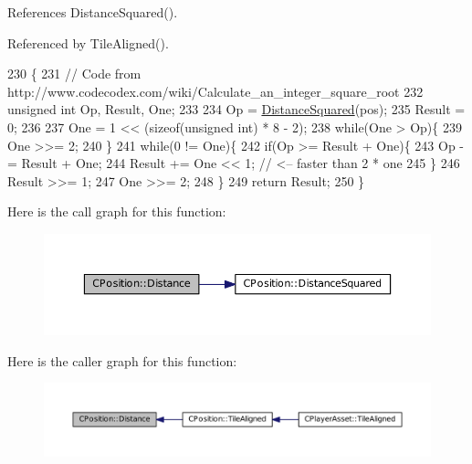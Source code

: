References Distance\+Squared().



Referenced by Tile\+Aligned().


\begin{DoxyCode}
230                                            \{
231     \textcolor{comment}{// Code from http://www.codecodex.com/wiki/Calculate\_an\_integer\_square\_root}
232     \textcolor{keywordtype}{unsigned} \textcolor{keywordtype}{int} Op, Result, One;
233     
234     Op = \hyperlink{classCPosition_acd96d507f44c0fdf13036ebc1a09e59c}{DistanceSquared}(pos);
235     Result = 0;
236     
237     One = 1 << (\textcolor{keyword}{sizeof}(\textcolor{keywordtype}{unsigned} int) * 8 - 2);
238     \textcolor{keywordflow}{while}(One > Op)\{
239         One >>= 2;
240     \}
241     \textcolor{keywordflow}{while}(0 != One)\{
242         \textcolor{keywordflow}{if}(Op >= Result + One)\{
243             Op -= Result + One;  
244             Result += One << 1;  \textcolor{comment}{// <-- faster than 2 * one  }
245         \}
246         Result >>= 1;
247         One >>= 2;
248     \}
249     \textcolor{keywordflow}{return} Result;    
250 \}
\end{DoxyCode}
Here is the call graph for this function\+:\nopagebreak
\begin{figure}[H]
\begin{center}
\leavevmode
\includegraphics[width=350pt]{classCPosition_a9edc6690c78a54ea08b137df83c22e91_cgraph}
\end{center}
\end{figure}
Here is the caller graph for this function\+:\nopagebreak
\begin{figure}[H]
\begin{center}
\leavevmode
\includegraphics[width=350pt]{classCPosition_a9edc6690c78a54ea08b137df83c22e91_icgraph}
\end{center}
\end{figure}
\hypertarget{classCPosition_acd96d507f44c0fdf13036ebc1a09e59c}{}\label{classCPosition_acd96d507f44c0fdf13036ebc1a09e59c} 
